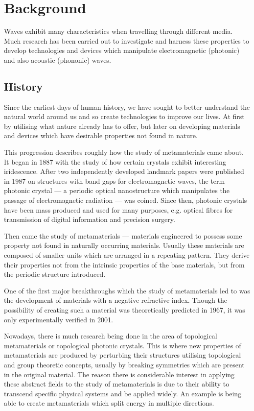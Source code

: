 \chapter{Background}
Waves exhibit many characteristics when travelling through different media.
Much research has been carried out to investigate and harness these properties
to develop technologies and devices which manipulate electromagnetic (photonic)
and also acoustic (phononic) waves.

\section{History}
Since the earliest days of human history, we have sought to better understand
the natural world around us and so create technologies to improve our lives. At
first by utilising what nature already has to offer, but later on developing
materials and devices which have desirable properties not found in nature.

This progression describes roughly how the study of metamaterials came about.
It began in 1887 with the study of how certain crystals exhibit interesting
iridescence.\cite{pcearliest} After two independently developed landmark papers
were published in 1987 on structures with band gaps for electromagnetic
waves,\cite{pceli,pcjohn} the term photonic crystal --- a periodic optical
nanostructure which manipulates the passage of electromagnetic radiation ---
was coined.\cite{pcfocus} Since then, photonic crystals have been mass produced
and used for many purposes, e.g. optical fibres for transmission of digital
information \cite{pcopfib} and precision surgery.\cite{pcsurgery,pcneuro}

Then came the study of metamaterials --- materials engineered to possess some
property not found in naturally occurring materials.\cite{briefintro} Usually
these materials are composed of smaller units which are arranged in a repeating
pattern. They derive their properties not from the intrinsic properties of the
base materials, but from the periodic structure introduced.

One of the first major breakthroughs which the study of metamaterials led to
was the development of materials with a negative refractive index. Though the
possibility of creating such a material was theoretically predicted in
1967,\cite{negrefrac} it was only experimentally verified in
2001.\cite{negrefracex}

Nowadays, there is much research being done in the area of topological
metamaterials or topological photonic
crystals.\cite{topoedge,toposplit,topomet} This is where new properties of
metamaterials are produced by perturbing their structures utilising topological
and group theoretic concepts, usually by breaking symmetries which are present
in the original material. The reason there is considerable interest in applying
these abstract fields to the study of metamaterials is due to their ability to
transcend specific physical systems and be applied widely. An example is being
able to create metamaterials which split energy in multiple
directions.\cite{toposplit} 

